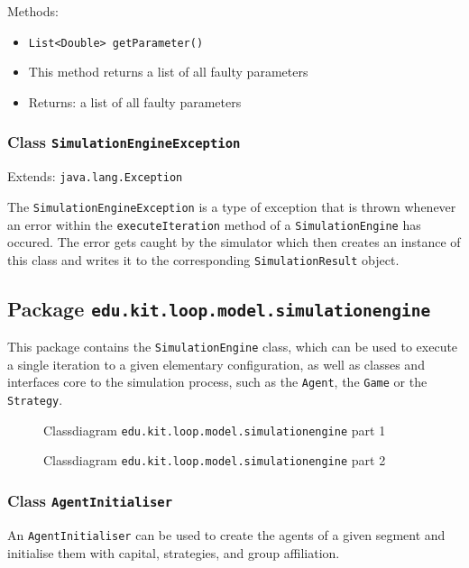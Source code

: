 \documentclass[parskip=full,11pt]{scrartcl}
\begin{document}
Methods:
\begin{itemize}\itemsep -10pt
	\item \texttt{List<Double> getParameter()}
	\item[] This method returns a list of all faulty parameters
	\item[] Returns: a list of all faulty parameters
\end{itemize}
\newpage
\subsubsection{Class \texttt{SimulationEngineException}}
Extends: \texttt{java.lang.Exception}

The \texttt{SimulationEngineException} is a type of exception that is thrown whenever an error within the \texttt{executeIteration} method of a \texttt{SimulationEngine} has occured. The error gets caught by the simulator which then creates an instance of this class and writes it to the corresponding \texttt{SimulationResult} object.

\subsection{Package \texttt{edu.kit.loop.model.simulationengine}}


This package contains the \texttt{SimulationEngine} class, which can be used to execute a single iteration to a given elementary configuration, as well as classes and interfaces core to the simulation process, such as the \texttt{Agent}, the \texttt{Game} or the \texttt{Strategy}.
\iftrue
\begin{figure}[h]
	\centering
	\fontsize{4}{8}\selectfont
	

	\caption{Classdiagram \texttt{edu.kit.loop.model.simulationengine} part 1}
\end{figure}

\begin{figure}[h]
	\centering
	\fontsize{3.5}{8}\selectfont
	

	\caption{Classdiagram \texttt{edu.kit.loop.model.simulationengine} part 2}
\end{figure}
\fi

\newpage
\subsubsection{Class \texttt{AgentInitialiser}}
An \texttt{AgentInitialiser} can be used to create the agents of a given segment and initialise them with capital, strategies, and group affiliation.
\end{document}

